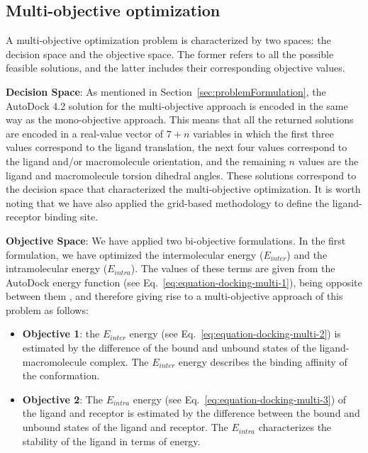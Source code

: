 \subsection{Multi-objective optimization}
\label{subsection:multi_solution}

A multi-objective optimization problem is characterized by two spaces: the decision space and the objective space. The former refers to all the possible feasible solutions, and the latter includes their corresponding objective values. 

\textbf{Decision Space}: As mentioned in Section~\ref{sec:problemFormulation}, the AutoDock 4.2 solution for the multi-objective approach is encoded in the same way as the mono-objective approach. This means that all the returned solutions are encoded in a real-value vector of $7 + n$ variables in which the first three values correspond to the ligand translation, the next four values correspond to the ligand and/or macromolecule orientation, and the remaining $n$ values are the ligand and macromolecule torsion dihedral angles. These solutions correspond to the decision space that characterized the multi-objective optimization. It is worth noting that we have also applied the grid-based methodology to define the ligand-receptor binding site.

\textbf{Objective Space}: We have applied two bi-objective formulations. In the first formulation, we have optimized the intermolecular energy ($E_{inter}$) and the intramolecular energy ($E_{intra}$). The values of these terms are given from the AutoDock energy function \cite{Morris2009} (see Eq.~\ref{eq:equation-docking-multi-1}), being opposite between them \cite{Janson2008}, and therefore giving rise to a multi-objective approach of this problem as follows:

\begin{itemize}
\item \textbf{Objective 1}: the $E_{inter}$ energy (see Eq.~\ref{eq:equation-docking-multi-2}) is estimated by the difference of the bound and unbound states of the ligand-macromolecule complex. The $E_{inter}$ energy describes the binding affinity of the conformation. 
\item \textbf{Objective 2}: The $E_{intra}$ energy (see Eq.~\ref{eq:equation-docking-multi-3}) of the ligand and receptor is estimated by the difference between the bound and unbound states of the ligand and receptor. The $E_{intra}$ characterizes the stability of the ligand in terms of energy.
\end{itemize}

